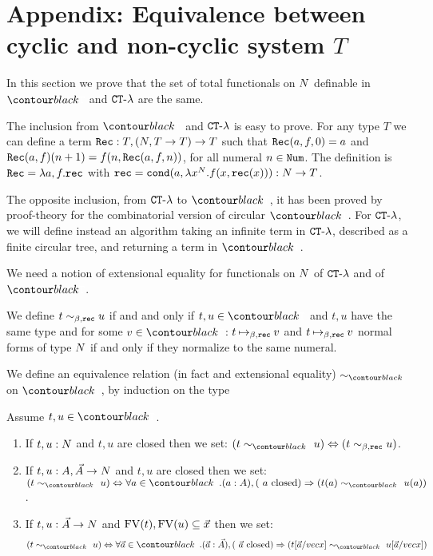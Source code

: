 \section{Appendix: Equivalence between cyclic and non-cyclic system $T$} 
\label{section-equivalence-cyclic-non-cyclic-T}
In this section we prove that the set of total functionals on ${N}$ definable in 
$\systemT$ and ${ {\tt CT} \mbox{-} \lambda}$ are the same.

The inclusion from $\systemT$ and ${ {\tt CT} \mbox{-} \lambda}$ is easy to prove.
For any type $T$ we can define a term ${\tt Rec}:T,({N},T \rightarrow T)\rightarrow T$ such that
${\tt Rec}(a,f,0) = a$ and ${\tt Rec}(a,f)(n+1) = f(n,{\tt Rec}(a,f,n))$, for all numeral $n \in {\tt Num}$.
The definition is ${\tt Rec} = \lambda a,f.{\tt rec}$ 
with ${\tt rec} = {\tt cond} (a,\lambda x^{{N}}.f(x,{\tt rec}(x))) : {N} \rightarrow T$.

The opposite inclusion, from ${ {\tt CT} \mbox{-} \lambda}$ to $\systemT$, it has been proved by proof-theory for the
combinatorial version of circular $\systemT$. For ${ {\tt CT} \mbox{-} \lambda}$, we will define instead an algorithm
taking an infinite term in  ${ {\tt CT} \mbox{-} \lambda}$, described as a finite circular tree, 
and returning a term in $\systemT$. 

We need a notion of extensional equality for  functionals on ${N}$ of ${ {\tt CT} \mbox{-} \lambda}$ and of $\systemT$. 

We define $t \sim_{\beta,{\tt rec}} u$ if and and only if $t, u \in \systemT$ and $t,u$ have the same type
and for some $v \in \systemT$: $t \mathbin{\mapsto}_{\beta,{\tt rec}} v$ and $t \mathbin{\mapsto}_{\beta,{\tt rec}} v$
normal forms of type ${N}$ if and only if they normalize to the same numeral.

We define an equivalence relation (in fact and extensional equality) 
$\sim_{\systemT}$ on $\systemT$, by induction on the type 


\begin{definition}
Assume $t,u \in \systemT$.
\begin{enumerate}
\item
If $t,u:{N}$ and $t,u$ are closed then we set: 
$(t \sim_{\systemT} u) \Leftrightarrow  (t \sim_{\beta,\rec} u)$.
\item
If $t,u:A,\vec{A}\rightarrow{N}$ and $t,u$ are closed then we set: 
$(t \sim_{\systemT} u) \Leftrightarrow  
\forall a \in \systemT. (a:A), (\mbox{ $a$ closed}) \Rightarrow (t(a) \sim_{\systemT} u(a))$.
\item
If $t,u:\vec{A}\rightarrow{N}$ and ${{\rm FV}}(t), {{\rm FV}}(u) \subseteq \vec{x}$ then we set:
$$
(t \sim_{\systemT} u) 
\Leftrightarrow  
\forall \vec{a} \in \systemT. 
(\vec{a}:\vec{A}), (\mbox{ $\vec{a}$ closed})  
\Rightarrow 
(t[\vec{a}/vec{x}] \sim_{\systemT} u[\vec{a}/vec{x}])
$$
\end{enumerate}
\end{definition}

